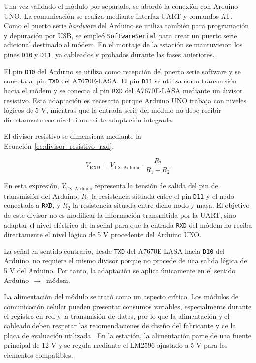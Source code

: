 Una vez validado el módulo por separado, se abordó la conexión con Arduino UNO. La comunicación se realiza mediante interfaz UART y comandos AT. Como el puerto serie \textit{hardware} del Arduino se utiliza también para programación y depuración por USB, se empleó \texttt{SoftwareSerial} para crear un puerto serie adicional destinado al módem. En el montaje de la estación se mantuvieron los pines \texttt{D10} y \texttt{D11}, ya cableados y probados durante las fases anteriores.

El pin \texttt{D10} del Arduino se utiliza como recepción del puerto serie software y se conecta al pin \texttt{TXD} del A7670E-LASA. El pin \texttt{D11} se utiliza como transmisión hacia el módem y se conecta al pin \texttt{RXD} del A7670E-LASA mediante un divisor resistivo. Esta adaptación es necesaria porque Arduino UNO trabaja con niveles lógicos de 5 V, mientras que la entrada serie del módulo no debe recibir directamente ese nivel si no existe adaptación integrada.

El divisor resistivo se dimensiona mediante la Ecuación~\ref{ec:divisor_resistivo_rxd}.

\begin{myequation}[h]
\begin{equation}
V_{\mathrm{RXD}} =
V_{\mathrm{TX,Arduino}}
\cdot
\frac{R_2}{R_1 + R_2}
\label{ec:divisor_resistivo_rxd}
\end{equation}
\caption[Cálculo de la tensión de salida del divisor resistivo]{Cálculo de la tensión aplicada a la entrada RXD del A7670E-LASA mediante un divisor resistivo}
\end{myequation}

En esta expresión, \(V_{\mathrm{TX,Arduino}}\) representa la tensión de salida del pin de transmisión del Arduino, \(R_1\) la resistencia situada entre el pin \texttt{D11} y el nodo conectado a \texttt{RXD}, y \(R_2\) la resistencia situada entre dicho nodo y masa. El objetivo de este divisor no es modificar la información transmitida por la UART, sino adaptar el nivel eléctrico de la señal para que la entrada \texttt{RXD} del módem no reciba directamente el nivel lógico de 5 V procedente del Arduino UNO.

La señal en sentido contrario, desde \texttt{TXD} del A7670E-LASA hacia \texttt{D10} del Arduino, no requiere el mismo divisor porque no procede de una salida lógica de 5 V del Arduino. Por tanto, la adaptación se aplica únicamente en el sentido Arduino~\(\rightarrow\)~módem.

La alimentación del módulo se trató como un aspecto crítico. Los módulos de comunicación celular pueden presentar consumos variables, especialmente durante el registro en red y la transmisión de datos, por lo que la alimentación y el cableado deben respetar las recomendaciones de diseño del fabricante y de la placa de evaluación utilizada \cite{simcom_a7670_hardware_design,waveshare_a7670e_hat}. En la estación, la alimentación parte de una fuente principal de 12 V y se regula mediante el LM2596 ajustado a 5 V para los elementos compatibles.

